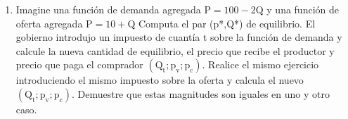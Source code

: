\documentclass[11pt,letterpaper]{article}
\begin{document}
\begin{enumerate}
\item Imagine una función de demanda agregada $\mathrm{P=100-2Q}$ y una función de oferta agregada $\mathrm{P=10+Q}$ Computa el par (p*,Q*) de equilibrio. El gobierno introdujo un impuesto de cuantía t sobre la función de demanda y calcule la nueva cantidad de equilibrio, el precio que recibe el productor y precio que paga el comprador $\mathrm{(Q_t;p_v;p_c)}$. Realice el mismo ejercicio introduciendo el mismo impuesto sobre la oferta y calcula el nuevo $\mathrm{(Q_t;p_v;p_c)}$. Demuestre que estas magnitudes son iguales en uno y otro caso.



\end{enumerate}
\end{document}
